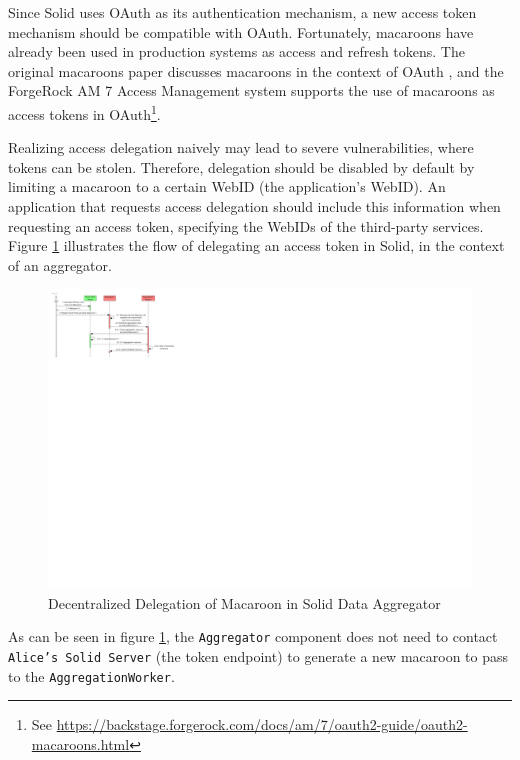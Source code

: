 Since Solid uses OAuth as its authentication mechanism, a new access token mechanism should be compatible with OAuth. Fortunately, macaroons have already been used in production systems as access and refresh tokens. The original macaroons paper discusses macaroons in the context of OAuth \citep[p.12]{macaroons}, and the ForgeRock AM 7 Access Management system supports the use of macaroons as access tokens in OAuth\footnote{See \url{https://backstage.forgerock.com/docs/am/7/oauth2-guide/oauth2-macaroons.html}}.

Realizing access delegation naively may lead to severe vulnerabilities, where tokens can be stolen. Therefore, delegation should be disabled by default by limiting a macaroon to a certain WebID (the application's WebID). An application that requests access delegation should include this information when requesting an access token, specifying the WebIDs of the third-party services. Figure \ref{fig:decentralized-delegation-macaroon} illustrates the flow of delegating an access token in Solid, in the context of an aggregator.

\begin{figure}[h]
    \centering
   \includegraphics[width=1.0\textwidth]{images/macaroons-solid/InteractionDiagram-Decentralized-Delegation-of-Macaroon.pdf}
    \caption{Decentralized Delegation of Macaroon in Solid Data Aggregator}
    \label{fig:decentralized-delegation-macaroon}
\end{figure}

\noindent As can be seen in figure \ref{fig:decentralized-delegation-macaroon}, the \texttt{Aggregator} component does not need to contact \texttt{Alice's Solid Server} (the token endpoint) to generate a new macaroon to pass to the \texttt{AggregationWorker}. 

